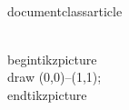 \\documentclass{article}
\begin{document}
\\begin{tikzpicture}\\draw (0,0)--(1,1);\\end{tikzpicture}\
\end{document}
